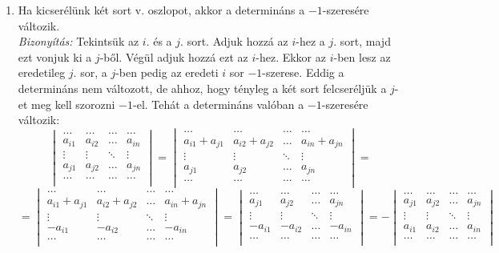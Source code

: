 \documentclass[a4paper,12pt,twoside]{book}
\theoremstyle{break}
\begin{document}
\begin{enumerate}
 \item Ha kicserélünk két sort v. oszlopot, akkor a determináns a $-1$-szeresére változik.\vspace*{5pt}\\
 \textit{Bizonyítás:} Tekintsük az $i$. és a $j$. sort. Adjuk hozzá az $i$-hez a $j$. sort, majd ezt vonjuk ki a $j$-ből. Végül adjuk hozzá ezt az $i$-hez. Ekkor az $i$-ben lesz az eredetileg $j$. sor, a $j$-ben pedig az eredeti $i$ sor $-1$-szerese. Eddig a determináns nem változott, de ahhoz, hogy tényleg a két sort felcseréljük a $j$-et meg kell szorozni $-1$-el. Tehát a determináns valóban a $-1$-szeresére változik:
\[\begin{vmatrix}
\ldots & \ldots & \ldots & \ldots\\
a_{i1} & a_{i2} & \ldots & a_{in}\\
\vdots & \vdots & \ddots & \vdots\\
a_{j1} & a_{j2} & \ldots & a_{jn}\\
\ldots & \ldots & \ldots & \ldots\\
\end{vmatrix} = \begin{vmatrix}
\ldots & \ldots & \ldots & \ldots\\
a_{i1}+a_{j1} & a_{i2}+a_{j2} & \ldots & a_{in}+a_{jn}\\
\vdots & \vdots & \ddots & \vdots\\
a_{j1} & a_{j2} & \ldots & a_{jn}\\
\ldots & \ldots & \ldots & \ldots\\
\end{vmatrix} =\]
\[ = \begin{vmatrix}
\ldots & \ldots & \ldots & \ldots\\
a_{i1}+a_{j1} & a_{i2}+a_{j2} & \ldots & a_{in}+a_{jn}\\
\vdots & \vdots & \ddots & \vdots\\
-a_{i1} & -a_{i2} & \ldots & -a_{in}\\
\ldots & \ldots & \ldots & \ldots\\
\end{vmatrix} = \begin{vmatrix}
\ldots & \ldots & \ldots & \ldots\\
a_{j1} & a_{j2} & \ldots & a_{jn}\\
\vdots & \vdots & \ddots & \vdots\\
-a_{i1} & -a_{i2} & \ldots & -a_{in}\\
\ldots & \ldots & \ldots & \ldots\\
\end{vmatrix} = -\begin{vmatrix}
\ldots & \ldots & \ldots & \ldots\\
a_{j1} & a_{j2} & \ldots & a_{jn}\\
\vdots & \vdots & \ddots & \vdots\\
a_{i1} & a_{i2} & \ldots & a_{in}\\
\ldots & \ldots & \ldots & \ldots\\
\end{vmatrix}\]

\end{enumerate}
\end{document}
